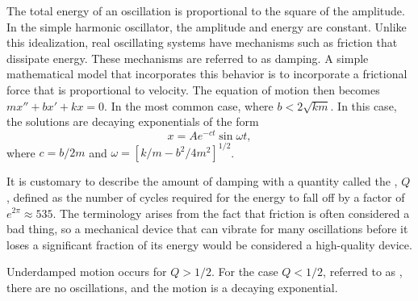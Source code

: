 The total energy of an oscillation is proportional to the square of
the amplitude. In the simple harmonic oscillator, the amplitude and
energy are constant.  Unlike this idealization, real oscillating
systems have mechanisms such as friction that dissipate energy. These mechanisms
are referred to as damping.
A simple mathematical model that incorporates this behavior is
to incorporate a frictional force that is proportional to velocity. The equation of motion
then becomes $mx''+bx'+kx=0$. In the most common case, where $b<2\sqrt{km}$.
In this  case,
the solutions are decaying exponentials of the form
\begin{equation*}
  x = A e^{-ct}\sin \omega t,
\end{equation*}
where $c=b/2m$ and $\omega=[k/m-b^2/4m^2]^{1/2}$. 

It is customary to describe the amount of damping with a quantity
called the , $Q$, defined
as the number of cycles required for the energy to fall off by a
factor of $e^{2\pi}\approx 535$. The terminology arises from the fact
that friction is often considered a bad thing, so a mechanical device
that can vibrate for many oscillations before it loses a significant
fraction of its energy would be considered a high-quality device.

Underdamped motion occurs for $Q>1/2$. For the case $Q<1/2$, referred to as ,
there are no oscillations, and the motion is a decaying exponential.
